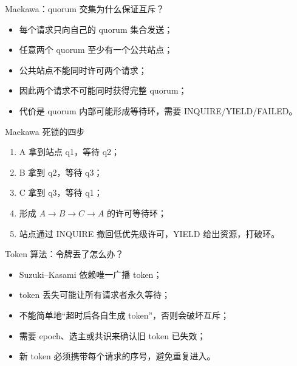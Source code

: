 \documentclass[UTF8,fontset=none,aspectratio=169,10pt]{beamer}
\begin{document}
\begin{frame}{Maekawa：quorum 交集为什么保证互斥？}
\begin{itemize}
  \item 每个请求只向自己的 quorum 集合发送；
  \item 任意两个 quorum 至少有一个公共站点；
  \item 公共站点不能同时许可两个请求；
  \item 因此两个请求不可能同时获得完整 quorum；
  \item 代价是 quorum 内部可能形成等待环，需要 INQUIRE/YIELD/FAILED。
\end{itemize}
\end{frame}

\begin{frame}{Maekawa 死锁的四步}
\begin{enumerate}
  \item A 拿到站点 q1，等待 q2；
  \item B 拿到 q2，等待 q3；
  \item C 拿到 q3，等待 q1；
  \item 形成 $A\rightarrow B\rightarrow C\rightarrow A$ 的许可等待环；
  \item 站点通过 INQUIRE 撤回低优先级许可，YIELD 给出资源，打破环。
\end{enumerate}
\end{frame}

\begin{frame}{Token 算法：令牌丢了怎么办？}
\begin{itemize}
  \item Suzuki--Kasami 依赖唯一广播 token；
  \item token 丢失可能让所有请求者永久等待；
  \item 不能简单地“超时后各自生成 token”，否则会破坏互斥；
  \item 需要 epoch、选主或共识来确认旧 token 已失效；
  \item 新 token 必须携带每个请求的序号，避免重复进入。
\end{itemize}
\end{frame}
\end{document}
